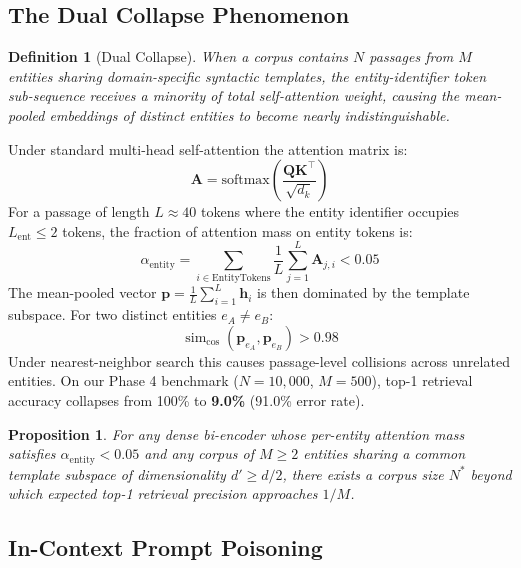 \documentclass[11pt,a4paper,twocolumn]{article}
\newcommand{\simcos}{\operatorname{sim}_{\text{cos}}}
\newtheorem{definition}{Definition}
\newtheorem{proposition}{Proposition}
\begin{document}
\subsection{The Dual Collapse Phenomenon}
\label{sec:dual_collapse}

\begin{definition}[Dual Collapse]
When a corpus contains $N$ passages from $M$ entities sharing
domain-specific syntactic templates, the entity-identifier token
sub-sequence receives a minority of total self-attention weight,
causing the mean-pooled embeddings of distinct entities to become
nearly indistinguishable.
\end{definition}

Under standard multi-head self-attention the attention matrix is:
\begin{equation}
  \mathbf{A} = \text{softmax}\!\left(\frac{\mathbf{Q}\mathbf{K}^\top}
  {\sqrt{d_k}}\right)
  \label{eq:attn}
\end{equation}
For a passage of length $L \approx 40$ tokens where the entity
identifier occupies $L_{\text{ent}} \le 2$ tokens, the fraction of
attention mass on entity tokens is:
\begin{equation}
  \alpha_{\text{entity}} =
  \sum_{i \in \text{EntityTokens}} \frac{1}{L}
  \sum_{j=1}^{L} \mathbf{A}_{j,i} < 0.05
  \label{eq:attn_mass}
\end{equation}
The mean-pooled vector $\mathbf{p} = \frac{1}{L}\sum_{i=1}^{L}
\mathbf{h}_i$ is then dominated by the template subspace.  For two
distinct entities $e_A \neq e_B$:
\begin{equation}
  \simcos(\mathbf{p}_{e_A}, \mathbf{p}_{e_B}) > 0.98
  \label{eq:collapse}
\end{equation}
Under nearest-neighbor search this causes passage-level collisions
across unrelated entities.  On our Phase 4 benchmark ($N=10{,}000$,
$M=500$), top-1 retrieval accuracy collapses from 100\% to
\textbf{9.0\%} (91.0\% error rate).

\begin{proposition}
For any dense bi-encoder whose per-entity attention mass satisfies
$\alpha_{\text{entity}} < 0.05$ and any corpus of $M \ge 2$ entities
sharing a common template subspace of dimensionality $d' \ge d/2$,
there exists a corpus size $N^*$ beyond which expected top-1 retrieval
precision approaches $1/M$.
\end{proposition}

\subsection{In-Context Prompt Poisoning}
\label{sec:poisoning}
\end{document}
